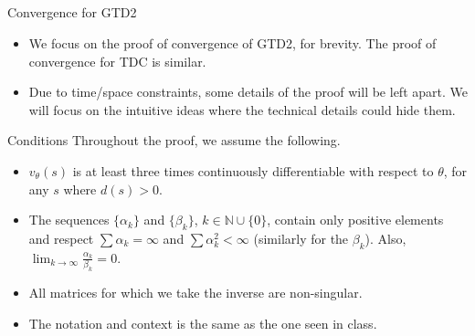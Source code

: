 \documentclass[11pt]{beamer}
\begin{document}
\subsection{}

\begin{frame}{Convergence for GTD2}
	\begin{itemize}
		\item We focus on the proof of convergence of GTD2, for brevity. The proof of convergence for TDC is similar.
		\item Due to time/space constraints, some details of the proof will be left apart. We will focus on the intuitive ideas where the technical details could hide them.
	\end{itemize}
\end{frame}
	
\begin{frame}{Conditions}
	Throughout the proof, we assume the following.
	\begin{itemize}
		\item $v_\theta(s)$ is at least three times continuously differentiable with respect to $\theta$, for any $s$ where $d(s) > 0$.
		\item The sequences $\{\alpha_k\}$ and $\{\beta_k\}$, $k \in \mathbb{N} \cup \{0\}$, contain only positive elements and respect $\sum \alpha_k = \infty$ and $\sum \alpha_k^2 < \infty$ (similarly for the $\beta_k$). Also, $\lim_{k \to \infty} \frac{\alpha_k}{\beta_k} = 0$.
		\item All matrices for which we take the inverse are non-singular.
		\vspace{1.5em}
		\item The notation and context is the same as the one seen in class.
	\end{itemize}
\end{frame}
\end{document}
